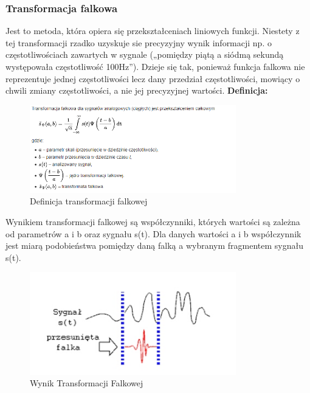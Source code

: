\documentclass[a4paper,titleauthor]{mwart}
\begin{document}
\subsubsection{Transformacja falkowa}
Jest to metoda, która opiera się przekształceniach liniowych funkcji. Niestety z tej transformacji rzadko uzyskuje sie precyzyjny wynik informacji np. o częstotliwościach zawartych w sygnale („pomiędzy piątą a siódmą sekundą występowała
częstotliwość 100Hz”). Dzieje się tak, ponieważ funkcja falkowa nie reprezentuje jednej częstotliwości lecz dany przedział częstotliwości, mowiący o chwili zmiany częstotliwości, a nie jej precyzyjnej wartości.
\newline \newline
\textbf{Definicja:}
\begin{figure}[h]
	\centering
	\includegraphics[width=0.8\textwidth]{falkowa.PNG}
	\caption{Definicja transformacji falkowej}
\end{figure}

Wynikiem transformacji falkowej są współczynniki, których wartości są zależna od parametrów a i b oraz sygnału s(t). Dla danych wartości a i b współczynnik jest miarą podobieństwa pomiędzy daną falką a wybranym fragmentem sygnału s(t).

\begin{figure}[ht]
	\centering
	\includegraphics[width=0.8\textwidth]{wynik_falki.PNG}
	\caption{Wynik Transformacji Falkowej}
\end{figure}
\end{document}
